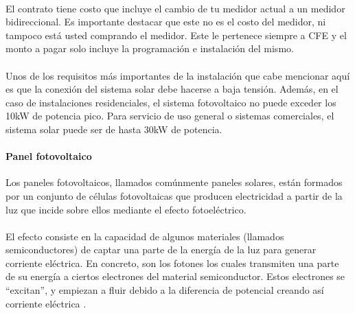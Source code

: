 \paragraph{}
El contrato tiene costo que incluye el cambio de tu medidor actual a un medidor bidireccional. Es importante destacar que este no es el costo del medidor, ni tampoco está usted comprando el medidor. Este le pertenece siempre a CFE y el monto a pagar solo incluye la programación e instalación del mismo.
\paragraph{}
Unos de los requisitos más importantes de la instalación que cabe mencionar aquí es que la conexión del sistema solar debe hacerse a baja tensión. Además, en el caso de instalaciones residenciales, el sistema fotovoltaico no puede exceder los 10kW de potencia pico. Para servicio de uso general o sistemas comerciales, el sistema solar puede ser de hasta 30kW de potencia.
\paragraph{}

\paragraph{Panel fotovoltaico}
Los paneles fotovoltaicos, llamados comúnmente paneles solares, están formados por un conjunto de células fotovoltaicas que producen electricidad a partir de la luz que incide sobre ellos mediante el efecto fotoeléctrico.
\paragraph{}
El efecto consiste en la capacidad de algunos materiales (llamados semiconductores) de captar una parte de la energía de la luz para generar corriente eléctrica. En concreto, son los fotones los cuales transmiten una parte de su energía a ciertos electrones del material semiconductor. Estos electrones se “excitan”, y empiezan a fluir debido a la diferencia de potencial creando así corriente eléctrica \citep{MarcoTeorico2}.

